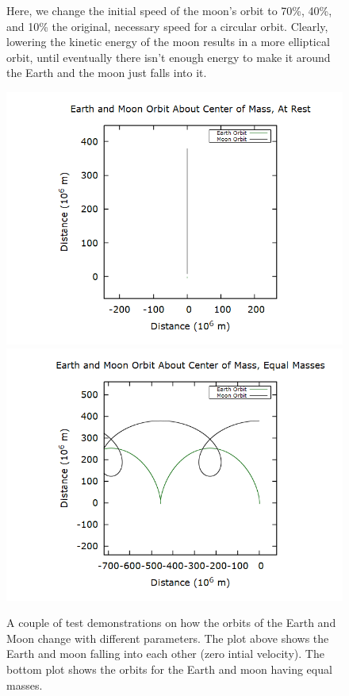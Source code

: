 \documentclass[aps,prl,twocolumn,superscriptaddress]{revtex4-1}
\begin{document}
\begin{figure}[htbp]
\begin{center}
  		\caption{Here, we change the initial speed of the moon's orbit to 70\%, 40\%, and 10\% the original, necessary speed for a circular orbit. Clearly, lowering the kinetic energy of the moon results in a more elliptical orbit, until eventually there isn't enough energy to make it around the Earth and the moon just falls into it.}
  		\label{gr:slowmoon}
 	\end{center}
\end{figure}

\begin{figure}[htbp]
  	\begin{center}
 		\includegraphics[scale=0.3]{emfall.png}
 		\includegraphics[scale=0.3]{emmass.png}
  		\caption{A couple of test demonstrations on how the orbits of the Earth and Moon change with different parameters. The plot above shows the Earth and moon falling into each other (zero intial velocity). The bottom plot shows the orbits for the Earth and moon having equal masses.}
  		\label{gr:test}
 	\end{center}
\end{figure}
\end{document}

